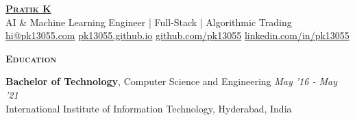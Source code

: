 \documentclass[10pt]{article}
\newcommand{\headerwidth}{7.45in}
\newenvironment{changemargin}[2]{%
  \begin{list}{}{%
    \setlength{\topsep}{0pt}%
    \setlength{\leftmargin}{#1}%
    \setlength{\rightmargin}{#2}%
    \setlength{\listparindent}{\parindent}%
    \setlength{\itemindent}{\parindent}%
    \setlength{\parsep}{\parskip}%
  }%
  \item[]}{\end{list}
}
\newcommand{\header}[1]{
	\begin{changemargin}{-0.75in}{-0.75in}
    \begin{tcolorbox}[colframe=mycolor,boxrule=0.0pt,arc=0pt,
      left=6pt,right=6pt,top=6pt,bottom=6pt,boxsep=0pt,width=\headerwidth]
		\scshape{\textbf{#1}}
\end{tcolorbox}
	\end{changemargin}
}
\newcommand{\name}[1]{
			{\LARGE \scshape {\textbf{#1}}}
}
\newenvironment{body} {
	\vspace*{-16pt}
	\begin{changemargin}{-0.6in}{-0.65in}
  }
	{\end{changemargin}
}
\begin{document}
\vspace{0.4em}
\hspace*{-5.5em}
\name{\href{https://pk13055.github.io}{\textbf{Pratik K}}} \\
\vspace{0.2em}\hspace*{-5.5em}
{\small AI \& Machine Learning Engineer | Full-Stack | Algorithmic Trading} \\
\vspace{0.2em}\hspace*{-5.5em}
{\small \href{mailto:hi@pk13055.com}{hi@pk13055.com} \textbar{} \href{https://pk13055.github.io}{pk13055.github.io} \textbar{} \href{https://github.com/pk13055}{github.com/pk13055} \textbar{} \href{https://linkedin.com/in/pk13055}{linkedin.com/in/pk13055}} \\


\header{Education}
\begin{body}
    \vspace{10pt}
	\textbf{Bachelor of Technology}, Computer Science and Engineering \hfill \emph{May '16 - May '21}\\
    International Institute of Information Technology, Hyderabad, India \hfill \\
\end{body}
\end{document}
